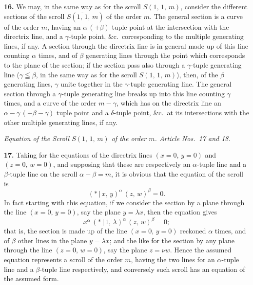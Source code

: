 \documentclass[11pt,a4paper]{article}
\providecommand{\mid}{\,|\,}
\begin{document}
\medskip

\textbf{16.} We may, in the same way as for the scroll $S(1,\,1,\,m)$, consider the different sections of the scroll $S(\overline{1,\,1},\,m)$ of the order $m$. The general section is a curve of the order $m$, having an $\alpha\,(+\beta)$ tuple point at the intersection with the directrix line, and a $\gamma$-tuple point, \&c.\ corresponding to the multiple generating lines, if any. A section through the directrix line is in general made up of this line counting $\alpha$ times, and of $\beta$ generating lines through the point which corresponds to the plane of the section; if the section pass also through a $\gamma$-tuple generating line ($\gamma \leqq \beta$, in the same way as for the scroll $S(1,\,1,\,m)$), then, of the $\beta$ generating lines, $\gamma$ unite together in the $\gamma$-tuple generating line. The general section through a $\gamma$-tuple generating line breaks up into this line counting $\gamma$ times, and a curve of the order $m - \gamma$, which has on the directrix line an $\alpha - \gamma\,(+\beta - \gamma)$ tuple point and a $\delta$-tuple point, \&c.\ at its intersections with the other multiple generating lines, if any.

\bigskip

\begin{center}
\textit{Equation of the Scroll $S(1,\,1,\,m)$ of the order $m$. Article Nos.\ 17 and 18.}
\end{center}

\textbf{17.} Taking for the equations of the directrix lines $(x = 0,\,y = 0)$ and $(z = 0,\,w = 0)$, and supposing that these are respectively an $\alpha$-tuple line and a $\beta$-tuple line on the scroll $\alpha + \beta = m$, it is obvious that the equation of the scroll is
\[
(*\mid x,\,y)^{\alpha}\,(z,\,w)^{\beta} = 0.
\]
In fact starting with this equation, if we consider the section by a plane through the line $(x = 0,\,y = 0)$, say the plane $y = \lambda x$, then the equation gives
\[
x^{\alpha}\,(*\mid 1,\,\lambda)^{\alpha}\,(z,\,w)^{\beta} = 0;
\]
that is, the section is made up of the line $(x = 0,\,y = 0)$ reckoned $\alpha$ times, and of $\beta$ other lines in the plane $y = \lambda x$; and the like for the section by any plane through the line $(z = 0,\,w = 0)$, say the plane $z = \nu w$. Hence the assumed equation represents a scroll of the order $m$, having the two lines for an $\alpha$-tuple line and a $\beta$-tuple line respectively, and conversely such scroll has an equation of the assumed form.
\end{document}
